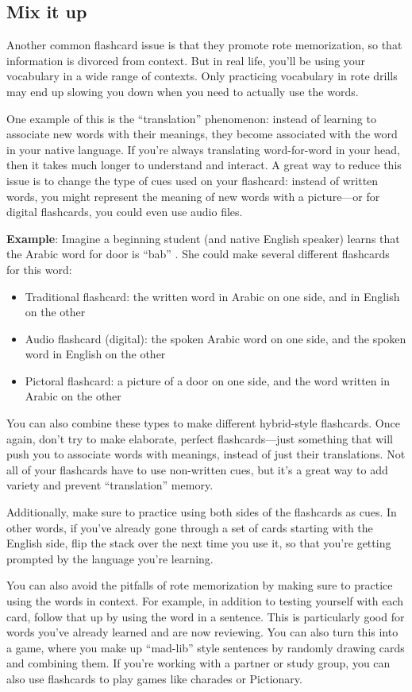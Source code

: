 \documentclass[../main.tex]{subfiles}
\begin{document}
\subsection{Mix it up}
Another common flashcard issue is that they promote rote memorization, so that
information is divorced from context. But in real life, you’ll be using your
vocabulary in a wide range of contexts. Only practicing vocabulary in rote
drills may end up slowing you down when you need to actually use the words.

One example of this is the “translation” phenomenon: instead of learning to
associate new words with their meanings, they become associated with the word in
your native language. If you’re always translating word-for-word in your head,
then it takes much longer to understand and interact. A great way to reduce this
issue is to change the type of cues used on your flashcard: instead of written
words, you might represent the meaning of new words with a picture—or for
digital flashcards, you could even use audio files.

\textbf{Example}: Imagine a beginning student (and native English speaker)
learns that the Arabic word for door is “bab” . She could make several
different flashcards for this word:
%
\begin{itemize}
  \item Traditional flashcard: the written word in Arabic on one side, and in
    English on the other
  \item Audio flashcard (digital): the spoken Arabic word on one side, and the
    spoken word in English on the other
  \item Pictoral flashcard: a picture of a door on one side, and the word
    written in Arabic on the other
\end{itemize}
%
You can also combine these types to make different hybrid-style flashcards. Once
again, don’t try to make elaborate, perfect flashcards—just something that will
push you to associate words with meanings, instead of just their translations.
Not all of your flashcards have to use non-written cues, but it’s a great way to
add variety and prevent “translation” memory.

Additionally, make sure to practice using both sides of the flashcards as cues.
In other words, if you’ve already gone through a set of cards starting with the
English side, flip the stack over the next time you use it, so that you’re
getting prompted by the language you’re learning.

You can also avoid the pitfalls of rote memorization by making sure to practice
using the words in context. For example, in addition to testing yourself with
each card, follow that up by using the word in a sentence. This is particularly
good for words you’ve already learned and are now reviewing. You can also turn
this into a game, where you make up “mad-lib” style sentences by randomly
drawing cards and combining them. If you’re working with a partner or study
group, you can also use flashcards to play games like charades or Pictionary.
%
\end{document}

